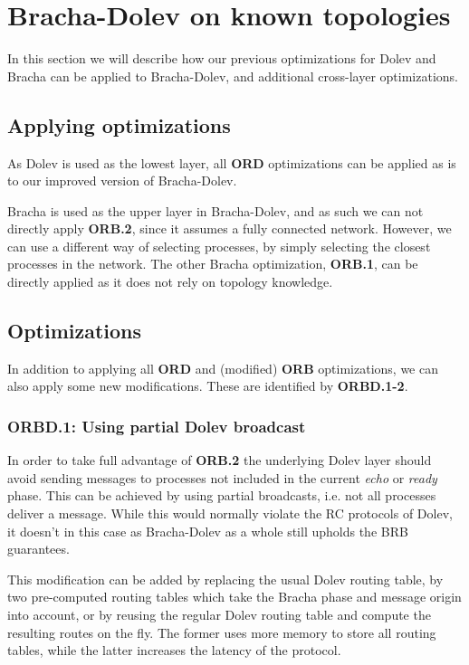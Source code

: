 \section{Bracha-Dolev on known topologies}
\label{contr-bracha-dolev}
In this section we will describe how our previous optimizations for Dolev and Bracha can be applied to Bracha-Dolev, and additional cross-layer optimizations.

\subsection{Applying optimizations}
As Dolev is used as the lowest layer, all \textbf{ORD} optimizations can be applied as is to our improved version of Bracha-Dolev.

Bracha is used as the upper layer in Bracha-Dolev, and as such we can not directly apply \textbf{ORB.2}, since it assumes a fully connected network. However, we can use a different way of selecting processes, by simply selecting the closest processes in the network.
The other Bracha optimization, \textbf{ORB.1}, can be directly applied as it does not rely on topology knowledge.

\subsection{Optimizations}
In addition to applying all \textbf{ORD} and (modified) \textbf{ORB} optimizations, we can also apply some new modifications. These are identified by \textbf{ORBD.1-2}.

\subsubsection{ORBD.1: Using partial Dolev broadcast}
In order to take full advantage of \textbf{ORB.2} the underlying Dolev layer should avoid sending messages to processes not included in the current \textit{echo} or \textit{ready} phase. This can be achieved by using partial broadcasts, i.e. not all processes deliver a message. While this would normally violate the RC protocols of Dolev, it doesn't in this case as Bracha-Dolev as a whole still upholds the BRB guarantees.

This modification can be added by replacing the usual Dolev routing table, by two pre-computed routing tables which take the Bracha phase and message origin into account, or by reusing the regular Dolev routing table and compute the resulting routes on the fly. The former uses more memory to store all routing tables, while the latter increases the latency of the protocol.

